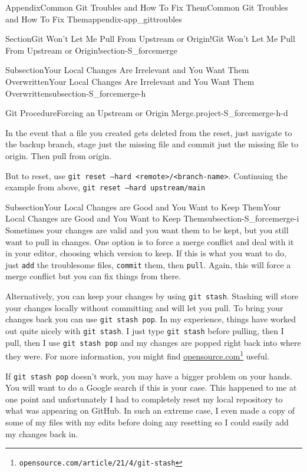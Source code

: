 \documentclass[twoside,10pt,]{book}
\newcommand{\mono}[1]{\texttt{#1}}
\begin{document}
\begin{appendixptx}{Appendix}{Common Git Troubles and How To Fix Them}{}{Common Git Troubles and How To Fix Them}{}{}{appendix-app_gittroubles}
\begin{sectionptx}{Section}{Git Won't Let Me Pull From Upstream or Origin!}{}{Git Won't Let Me Pull From Upstream or Origin!}{}{}{section-S_forcemerge}
\begin{subsectionptx}{Subsection}{Your Local Changes Are Irrelevant and You Want Them Overwritten}{}{Your Local Changes Are Irrelevant and You Want Them Overwritten}{}{}{subsection-S_forcemerge-h}
\begin{project}{Git Procedure}{Forcing an Upstream or Origin Merge.}{project-S_forcemerge-h-d}
\begin{enumerate}[font=\bfseries,label=(\alph*),ref=\alph*]
\par
In the event that a file you created gets deleted from the reset, just navigate to the backup branch, stage just the missing file and commit just the missing file to origin. Then pull from origin.%
\par
But to reset, use \mono{git reset --hard <remote>/<branch-name>}. Continuing the example from above, \mono{git reset --hard upstream/main}%
\end{enumerate}%
\end{project}%
\end{subsectionptx}
%
%
\typeout{************************************************}
\typeout{************************************************}
%
\begin{subsectionptx}{Subsection}{Your Local Changes are Good and You Want to Keep Them}{}{Your Local Changes are Good and You Want to Keep Them}{}{}{subsection-S_forcemerge-i}
%
%
Sometimes your changes are valid and you want them to be kept, but you still want to pull in changes. One option is to force a merge conflict and deal with it in your editor, choosing which version to keep. If this is what you want to do, just \mono{add} the troublesome files, \mono{commit} them, then \mono{pull}. Again, this will force a merge conflict but you can fix things from there.%
\par
Alternatively, you can keep your changes by using \mono{git stash}. Stashing will store your changes locally without committing and will let you pull. To bring your changes back you can use \mono{git stash pop}. In my experience, things have worked out quite nicely with \mono{git stash}. I just type \mono{git stash} before pulling, then I pull, then I use \mono{git stash pop} and my changes are popped right back into where they were. For more information, you might find \href{https://opensource.com/article/21/4/git-stash}{opensource.com}\footnote{\nolinkurl{opensource.com/article/21/4/git-stash}\label{fn-S_forcemerge-i-e-g}} useful.%
\par
If \mono{git stash pop} doesn't work, you may have a bigger problem on your hands. You will want to do a Google search if this is your case. This happened to me at one point and unfortunately I had to completely reset my local repository to what was appearing on GitHub. In such an extreme case, I even made a copy of some of my files with my edits before doing any resetting so I could easily add my changes back in.%
\end{subsectionptx}

\end{sectionptx}
\end{appendixptx}
\end{document}
